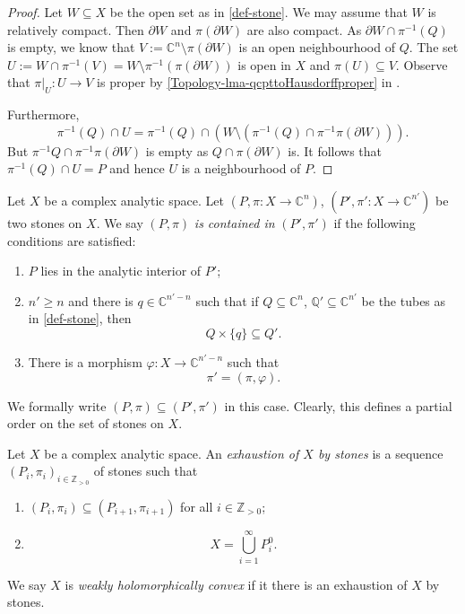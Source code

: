 \begin{proof}
    Let $W\subseteq X$ be the open set as in \cref{def-stone}. We may assume that $W$ is relatively compact. Then $\partial W$ and $\pi(\partial W)$ are also compact. As $\partial W\cap \pi^{-1}(Q)$ is empty, we know that $V:=\mathbb{C}^n\setminus \pi(\partial W)$ is an open neighbourhood of $Q$. The set $U:=W\cap \pi^{-1}(V)=W\setminus \pi^{-1}(\pi(\partial W))$ is open in $X$ and $\pi(U)\subseteq V$. Observe that $\pi|_U:U\rightarrow V$ is proper by \cref{Topology-lma-qcpttoHausdorffproper} in .
    
    Furthermore,
    \[
        \pi^{-1}(Q)\cap U=\pi^{-1}(Q)\cap \left( W\setminus \left(\pi^{-1}(Q)\cap \pi^{-1}\pi(\partial W)\right) \right).  
    \]
    But $\pi^{-1}Q\cap \pi^{-1}\pi(\partial W)$ is empty as $Q\cap \pi(\partial W)$ is. It follows that $\pi^{-1}(Q)\cap U=P$ and hence $U$ is a neighbourhood of $P$.
\end{proof}

\begin{definition}
    Let $X$ be a complex analytic space.
    Let $(P,\pi:X\rightarrow \mathbb{C}^{n})$, $(P',\pi':X\rightarrow \mathbb{C}^{n'})$ be two stones on $X$. We say $(P,\pi)$ \emph{is contained in} $(P',\pi')$ if the following conditions are satisfied:
    \begin{enumerate}
        \item $P$ lies in the analytic interior of $P'$;
        \item $n'\geq n$ and there is $q\in \mathbb{C}^{n'-n}$ such that if $Q\subseteq \mathbb{C}^n$, $\mathbb{Q}'\subseteq \mathbb{C}^{n'}$ be the tubes as in \cref{def-stone}, then
            \[
                Q\times\{q\}\subseteq Q'.
            \]
        \item There is a morphism $\varphi:X\rightarrow \mathbb{C}^{n'-n}$ such that 
            \[
                \pi'=(\pi,\varphi).
            \]
    \end{enumerate}
    We formally write $(P,\pi)\subseteq (P',\pi')$ in this case. Clearly, this defines a partial order on the set of stones on $X$.
\end{definition}

\begin{definition}
    Let $X$ be a complex analytic space. An \emph{exhaustion of $X$ by stones} is a sequence $(P_i,\pi_i)_{i\in \mathbb{Z}_{>0}}$ of stones such that 
    \begin{enumerate}
        \item $(P_i,\pi_i)\subseteq (P_{i+1},\pi_{i+1})$ for all $i\in \mathbb{Z}_{>0}$;
        \item 
            \[
                X=\bigcup_{i=1}^{\infty} P_i^0.
            \]
    \end{enumerate}
    We say $X$ is \emph{weakly holomorphically convex} if it there is an exhaustion of $X$ by stones.
\end{definition}

